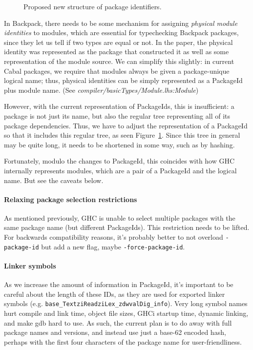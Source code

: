 \documentclass{article}
\newcommand{\ghcfile}[1]{\textsl{#1}}
\begin{document}
\begin{figure}
\label{fig:proposed-pkgid}\caption{Proposed new structure of package identifiers.}
\end{figure}

In Backpack, there needs to be some mechanism for assigning
\emph{physical module identities} to modules, which are essential for
typechecking Backpack packages, since they let us tell if two types are
equal or not. In the paper, the physical identity was represented as the
package that constructed it as well as some representation of the module
source.  We can simplify this slightly: in current Cabal packages, we
require that modules always be given a package-unique logical name;
thus, physical identities can be simply represented as a PackageId plus
module name. (See \ghcfile{compiler/basicTypes/Module.lhs:Module})

However, with the current representation of PackageIds, this is
insufficient: a package is not just its name, but also the regular
tree representing all of its package dependencies.  Thus, we have
to adjust the representation of a PackageId so that it includes this
regular tree, as seen Figure~\ref{fig:proposed-pkgid}.  Since this
tree in general may be quite long, it needs to be shortened in some way,
such as by hashing.

Fortunately, modulo the changes to PackageId, this coincides with how
GHC internally represents modules, which are a pair of a PackageId and the
logical name.  But see the caveats below.

\paragraph{Relaxing package selection restrictions}  As mentioned
previously, GHC is unable to select multiple packages with the same
package name (but different PackageIds).  This restriction needs to be
lifted.  For backwards compatibility reasons, it's probably better to
not overload \verb|-package-id| but add a new flag, maybe \verb|-force-package-id|.

\paragraph{Linker symbols} As we increase the amount of information in
PackageId, it's important to be careful about the length of these IDs,
as they are used for exported linker symbols (e.g.
\verb|base_TextziReadziLex_zdwvalDig_info|).  Very long symbol names
hurt compile and link time, object file sizes, GHCi startup time,
dynamic linking, and make gdb hard to use.  As such, the current plan is
to do away with full package names and versions, and instead use just a
base-62 encoded hash, perhaps with the first four characters of the package
name for user-friendliness.
\end{document}
